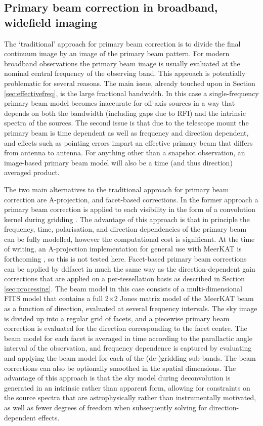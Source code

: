 \documentclass[usenatbib,usedcolumn]{mnras}
\begin{document}
\subsection{Primary beam correction in broadband, widefield imaging}
\label{sec:primarybeams}

The `traditional' approach for primary beam correction is to divide the final continuum image by an image of the primary beam pattern. For modern broadband observations the primary beam image is usually evaluated at the nominal central frequency of the observing band. This approach is potentially problematic for several reasons. The main issue, already touched upon in Section \ref{sec:effectivefreq}, is the large fractional bandwidth. In this case a single-frequency primary beam model becomes inaccurate for off-axis sources in a way that depends on both the bandwidth (including gaps due to RFI) and the intrinsic spectra of the sources. The second issue is that due to the telescope mount the primary beam is time dependent as well as frequency and direction dependent, and effects such as pointing errors impart an effective primary beam that differs from antenna to antenna. For anything other than a snapshot observation, an image-based primary beam model will also be a time (and thus direction) averaged product.

The two main alternatives to the traditional approach for primary beam correction are A-projection, and facet-based corrections. In the former approach a primary beam correction is applied to each visibility in the form of a convolution kernel during gridding \citep{bhatnagar2013}. The advantage of this approach is that in principle the frequency, time, polarisation, and direction dependencies of the primary beam can be fully modelled, however the computational cost is significant. At the time of writing, an A-projection implementation for general use with MeerKAT is forthcoming \citep{sekhar2021}, so this is not tested here. Facet-based primary beam corrections can be applied by {\sc ddfacet} \citep{tasse2018} in much the same way as the direction-dependent gain corrections that are applied on a per-tessellation basis as described in Section \ref{sec:processing}. The beam model in this case consists of a multi-dimensional FITS model that contains a full 2$\times$2 Jones matrix model of the MeerKAT beam as a function of direction, evaluated at several frequency intervals. The sky image is divided up into a regular grid of facets, and a piecewise primary beam correction is evaluated for the direction corresponding to the facet centre. The beam model for each facet is averaged in time according to the parallactic angle interval of the observation, and frequency dependence is captured by evaluating and applying the beam model for each of the (de-)gridding sub-bands. The beam corrections can also be optionally smoothed in the spatial dimensions. The advantage of this approach is that the sky model during deconvolution is generated in an intrinsic rather than apparent form, allowing for constraints on the source spectra that are astrophysically rather than instrumentally motivated, as well as fewer degrees of freedom when subsequently solving for direction-dependent effects.
\end{document}
